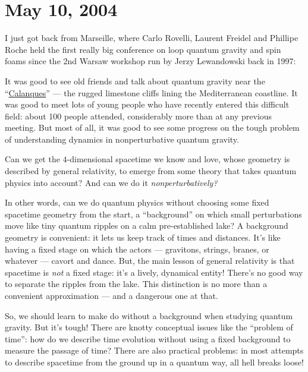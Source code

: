 \documentclass{article}
\def\tightlist{}
\renewcommand{\texttt}[1]{%
  \begingroup
  \ttfamily
  \begingroup\lccode`~=`/\lowercase{\endgroup\def~}{/\discretionary{}{}{}}%
  \begingroup\lccode`~=`[\lowercase{\endgroup\def~}{[\discretionary{}{}{}}%
  \begingroup\lccode`~=`.\lowercase{\endgroup\def~}{.\discretionary{}{}{}}%
  \catcode`/=\active\catcode`[=\active\catcode`.=\active
  \scantokens{#1\noexpand}%
  \endgroup
}
\begin{document}
\hypertarget{week206}{%
\section{May 10, 2004}\label{week206}}

I just got back from Marseille, where Carlo Rovelli, Laurent Freidel and
Phillipe Roche held the first really big conference on loop quantum
gravity and spin foams since the 2nd Warsaw workshop run by Jerzy
Lewandowski back in 1997:


It was good to see old friends and talk about quantum gravity near the
``\href{https://math.ucr.edu/home/baez/marseille/}{Calanques}'' --- the
rugged limestone cliffs lining the Mediterranean coastline. It was good
to meet lots of young people who have recently entered this difficult
field: about 100 people attended, considerably more than at any previous
meeting. But most of all, it was good to see some progress on the tough
problem of understanding dynamics in nonperturbative quantum gravity.

Can we get the \(4\)-dimensional spacetime we know and love, whose
geometry is described by general relativity, to emerge from some theory
that takes quantum physics into account? And can we do it
\emph{nonperturbatively?}

In other words, can we do quantum physics without choosing some fixed
spacetime geometry from the start, a ``background'' on which small
perturbations move like tiny quantum ripples on a calm pre-established
lake? A background geometry is convenient: it lets us keep track of
times and distances. It's like having a fixed stage on which the actors
--- gravitons, strings, branes, or whatever --- cavort and dance. But,
the main lesson of general relativity is that spacetime is \emph{not} a
fixed stage: it's a lively, dynamical entity! There's no good way to
separate the ripples from the lake. This distinction is no more than a
convenient approximation --- and a dangerous one at that.

So, we should learn to make do without a background when studying
quantum gravity. But it's tough! There are knotty conceptual issues like
the ``problem of time'': how do we describe time evolution without using
a fixed background to measure the passage of time? There are also
practical problems: in most attempts to describe spacetime from the
ground up in a quantum way, all hell breaks loose!
\end{document}
